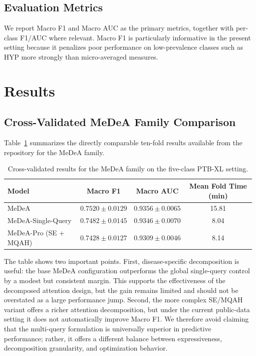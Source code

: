 \documentclass[11pt]{article}
\begin{document}
\subsection{Evaluation Metrics}

We report Macro F1 and Macro AUC as the primary metrics, together with per-class F1/AUC where relevant. Macro F1 is particularly informative in the present setting because it penalizes poor performance on low-prevalence classes such as HYP more strongly than micro-averaged measures.

\section{Results}

\subsection{Cross-Validated MeDeA Family Comparison}

Table~\ref{tab:meadea-family} summarizes the directly comparable ten-fold results available from the repository for the MeDeA family.

\begin{table}[htbp]
\centering
\caption{Cross-validated results for the MeDeA family on the five-class PTB-XL setting.}
\label{tab:meadea-family}
\begin{tabular}{lccc}
\toprule
Model & Macro F1 & Macro AUC & Mean Fold Time (min) \\
\midrule
MeDeA & $0.7520 \pm 0.0129$ & $0.9356 \pm 0.0065$ & 15.81 \\
MeDeA-Single-Query & $0.7482 \pm 0.0145$ & $0.9346 \pm 0.0070$ & 8.04 \\
MeDeA-Pro (SE + MQAH) & $0.7428 \pm 0.0127$ & $0.9309 \pm 0.0046$ & 8.14 \\
\bottomrule
\end{tabular}
\end{table}

The table shows two important points. First, disease-specific decomposition is useful: the base MeDeA configuration outperforms the global single-query control by a modest but consistent margin. This supports the effectiveness of the decomposed attention design, but the gain remains limited and should not be overstated as a large performance jump. Second, the more complex SE/MQAH variant offers a richer attention decomposition, but under the current public-data setting it does not automatically improve Macro F1. We therefore avoid claiming that the multi-query formulation is universally superior in predictive performance; rather, it offers a different balance between expressiveness, decomposition granularity, and optimization behavior.
\end{document}
